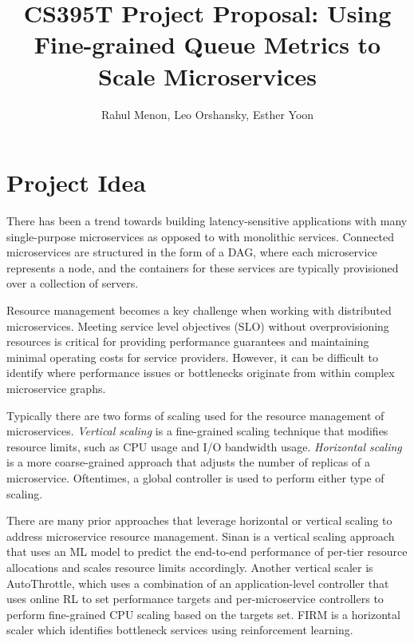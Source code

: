 \documentclass{proposal}
\begin{document}

\title{CS395T Project Proposal: Using Fine-grained Queue Metrics to Scale Microservices
}

\author{Rahul Menon, Leo Orshansky, Esther Yoon}

\maketitle

\begin{abstract}
\end{abstract}

\section{Project Idea}
There has been a trend towards building latency-sensitive applications with many single-purpose microservices as opposed to with monolithic services. Connected microservices are structured in the form of a DAG, where each microservice represents a node, and the containers for these services are typically provisioned over a collection of servers.

Resource management becomes a key challenge when working with distributed microservices. Meeting service level objectives (SLO) without overprovisioning resources is critical for providing performance guarantees and maintaining minimal operating costs for service providers. However, it can be difficult to identify where performance issues or bottlenecks originate from within complex microservice graphs.

Typically there are two forms of scaling used for the resource management of microservices. \textit{Vertical scaling} is a fine-grained scaling technique that modifies resource limits, such as CPU usage and I/O bandwidth usage. \textit{Horizontal scaling} is a more coarse-grained approach that adjusts the number of replicas of a microservice. Oftentimes, a global controller is used to perform either type of scaling.

There are many prior approaches that leverage horizontal or vertical scaling to address microservice resource management. Sinan is a vertical scaling approach that uses an ML model to predict the end-to-end performance of per-tier resource allocations and scales resource limits accordingly. Another vertical scaler is AutoThrottle, which uses a combination of an application-level controller that uses online RL to set performance targets and per-microservice controllers to perform fine-grained CPU scaling based on the targets set. FIRM is a horizontal scaler which identifies bottleneck services using reinforcement learning. 
\end{document}
